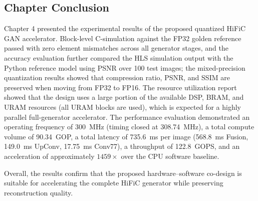 \subsection{Chapter Conclusion}

Chapter 4 presented the experimental results of the proposed quantized HiFiC GAN accelerator. Block-level C-simulation against the FP32 golden reference passed with zero element mismatches across all generator stages, and the accuracy evaluation further compared the HLS simulation output with the Python reference model using PSNR over 100 test images; the mixed-precision quantization results showed that compression ratio, PSNR, and SSIM are preserved when moving from FP32 to FP16. The resource utilization report showed that the design uses a large portion of the available DSP, BRAM, and URAM resources (all URAM blocks are used), which is expected for a highly parallel full-generator accelerator. The performance evaluation demonstrated an operating frequency of 300~MHz (timing closed at 308.74~MHz), a total compute volume of 90.34~GOP, a total latency of 735.6~ms per image (568.8~ms Fusion, 149.0~ms UpConv, 17.75~ms Conv77), a throughput of 122.8~GOPS, and an acceleration of approximately $1459\times$ over the CPU software baseline.

Overall, the results confirm that the proposed hardware--software co-design is suitable for accelerating the complete HiFiC generator while preserving reconstruction quality.
